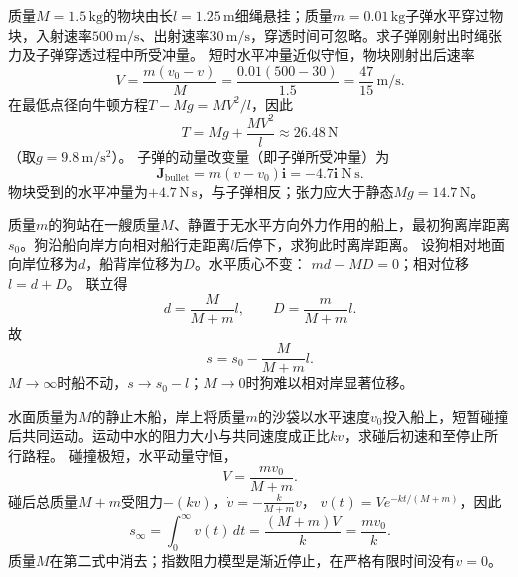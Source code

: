 \problemtext 质量$M=1.5\,\mathrm{kg}$的物块由长$l=1.25\,\mathrm m$细绳悬挂；质量$m=0.01\,\mathrm{kg}$子弹水平穿过物块，入射速率$500\,\mathrm{m/s}$、出射速率$30\,\mathrm{m/s}$，穿透时间可忽略。求子弹刚射出时绳张力及子弹穿透过程中所受冲量。
\workings
短时水平冲量近似守恒，物块刚射出后速率
\[
V=\frac{m(v_0-v)}{M}
=\frac{0.01(500-30)}{1.5}=\frac{47}{15}\,\mathrm{m/s}.
\]
在最低点径向牛顿方程$T-Mg=MV^2/l$，因此
\[
\boxed{T=Mg+\frac{MV^2}{l}\approx26.48\,\mathrm N}
\]
（取$g=9.8\,\mathrm{m/s^2}$）。
子弹的动量改变量（即子弹所受冲量）为
\[
\boxed{\bm J_{\mathrm{bullet}}=m(v-v_0)\bm i=-4.7\bm i\ \mathrm{N\,s}}.
\]
\crosscheck 物块受到的水平冲量为$+4.7\,\mathrm{N\,s}$，与子弹相反；张力应大于静态$Mg=14.7\,\mathrm N$。

\problemtext 质量$m$的狗站在一艘质量$M$、静置于无水平方向外力作用的船上，最初狗离岸距离$s_0$。狗沿船向岸方向相对船行走距离$l$后停下，求狗此时离岸距离。
\workings
设狗相对地面向岸位移为$d$，船背岸位移为$D$。水平质心不变：
$md-MD=0$；相对位移$l=d+D$。
联立得
\[
d=\frac{M}{M+m}l,\qquad D=\frac{m}{M+m}l.
\]
故
\[
\boxed{s=s_0-\frac{M}{M+m}l}.
\]
\crosscheck $M\to\infty$时船不动，$s\to s_0-l$；$M\to0$时狗难以相对岸显著位移。

\problemtext 水面质量为$M$的静止木船，岸上将质量$m$的沙袋以水平速度$v_0$投入船上，短暂碰撞后共同运动。运动中水的阻力大小与共同速度成正比$kv$，求碰后初速和至停止所行路程。
\workings
碰撞极短，水平动量守恒，
\[
\boxed{V=\frac{mv_0}{M+m}}.
\]
碰后总质量$M+m$受阻力$-(kv)$，$\dot v=-\frac{k}{M+m}v$，
$v(t)=Ve^{-kt/(M+m)}$，因此
\[
\boxed{s_\infty=\int_0^\infty v(t)\,dt
=\frac{(M+m)V}{k}=\frac{mv_0}{k}}.
\]
\crosscheck 质量$M$在第二式中消去；指数阻力模型是渐近停止，在严格有限时间没有$v=0$。
